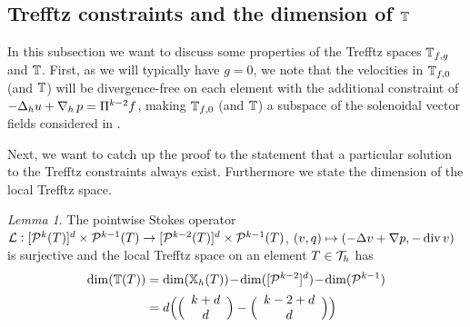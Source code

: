 \documentclass[sn-mathphys,Numbered]{sn-jnl}%
\theoremstyle{remark}%
\newtheorem{lemma}[theorem]{Lemma}
\theoremstyle{definition}%
\begin{document}
\subsection{Trefftz constraints and the dimension of \texorpdfstring{$\mathbb{T}$}{T}} \label{sec:dofs}
In this subsection we want to discuss some properties of the Trefftz spaces $\mathbb{T}_{f,g}$ and $\mathbb{T}$.
First, as we will typically have $g=0$, we note that the velocities in $\mathbb{T}_{f,0}$ (and $\mathbb{T}$) will be divergence-free on each element with the additional constraint of $-\Delta_h u+\operatorname{\nabla}_h p= \Pi^{k-2} f$, making $\mathbb{T}_{f,0}$ (and $\mathbb{T}$) a subspace of the solenoidal vector fields considered in \cite{BJK90,montlaur2010discontinuous}.

Next, we want to catch up the proof to the statement that a particular solution to the Trefftz constraints always exist. Furthermore we state the dimension of the local Trefftz space.
\begin{lemma} \label{lem:surj} 
 The pointwise Stokes operator $\mathcal{L} : [\mathcal{P}^{k}(T)]^d \times \mathcal{P}^{k-1}(T) \to [\mathcal{P}^{k-2}(T)]^d \times \mathcal{P}^{k-1}(T)$, $(v,q) \mapsto (-\Delta v + \nabla p, - \operatorname{\mathrm{div}} v)$ is surjective 
and the local Trefftz space on an element $T\in{\mathcal{T}_h}$ has
\begin{align} \label{eq:dimTT}
\dim( \mathbb{T}(T)) & = 
\dim(\mathbb{X}_h(T)) \!-\! \dim([\mathcal{P}^{k-2}]^d) \!-\! \dim(\mathcal{P}^{k-1})
\\ & =
d \Big(  \Big( \begin{array}{c} k + d \\ d \end{array} \Big) - \Big( \begin{array}{c} k- 2 + d \\ d \end{array} \Big)  \Big) \nonumber
\end{align}
\end{lemma}
\end{document}
